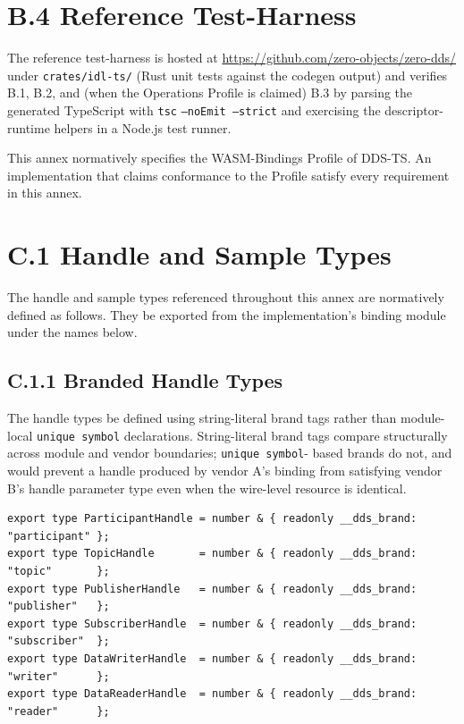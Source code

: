\documentclass{../styles/zerodds-vendor-spec}
\begin{document}
\section*{B.4 Reference Test-Harness}

The reference test-harness is hosted at
\url{https://github.com/zero-objects/zero-dds/}
under \texttt{crates/idl-ts/} (Rust unit tests against the codegen
output) and verifies B.1, B.2, and (when the
Operations Profile is claimed) B.3 by parsing the generated
TypeScript with \texttt{tsc} \texttt{--noEmit --strict} and
exercising the descriptor-runtime helpers in a Node.js test
runner.

\label{sec:wasm-reservation}

This annex normatively specifies the WASM-Bindings Profile of
DDS-TS. An implementation that claims conformance to the Profile
 satisfy every requirement in this annex.

\section*{C.1 Handle and Sample Types}\label{sec:wasm-types}

The handle and sample types referenced throughout this annex are
normatively defined as follows. They  be exported
from the implementation's binding module under the names below.

\subsection*{C.1.1 Branded Handle Types}

The handle types  be defined using string-literal
brand tags rather than module-local \texttt{unique symbol}
declarations. String-literal brand tags compare structurally
across module and vendor boundaries; \texttt{unique symbol}-
based brands do not, and would prevent a handle produced by
vendor A's binding from satisfying vendor B's handle parameter
type even when the wire-level resource is identical.

\begin{lstlisting}
export type ParticipantHandle = number & { readonly __dds_brand: "participant" };
export type TopicHandle       = number & { readonly __dds_brand: "topic"       };
export type PublisherHandle   = number & { readonly __dds_brand: "publisher"   };
export type SubscriberHandle  = number & { readonly __dds_brand: "subscriber"  };
export type DataWriterHandle  = number & { readonly __dds_brand: "writer"      };
export type DataReaderHandle  = number & { readonly __dds_brand: "reader"      };
\end{lstlisting}
\end{document}
